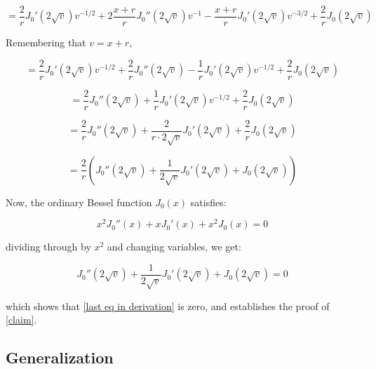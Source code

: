 \documentclass{article}
\begin{document}
\begin{equation*}
=\frac{2}{r} J_0'(2\sqrt{v}) v^{-1/2} + 2\frac{x+r}{r} J_0''(2\sqrt{v}) v^{-1} - \frac{x+r}{r} J_0'(2\sqrt{v}) v^{-3/2}
+ \frac{2}{r} J_0(2\sqrt{v})
\end{equation*}

Remembering that $v=x+r$,


\begin{equation*}
=\frac{2}{r} J_0'(2\sqrt{v}) v^{-1/2} + \frac{2}{r} J_0''(2\sqrt{v}) - \frac{1}{r} J_0'(2\sqrt{v}) v^{-1/2}
+ \frac{2}{r} J_0(2\sqrt{v})
\end{equation*}

\begin{equation*}
=\frac{2}{r} J_0''(2\sqrt{v}) + \frac{1}{r} J_0'(2\sqrt{v}) v^{-1/2} + \frac{2}{r} J_0(2\sqrt{v})
\end{equation*}

\begin{equation*}
=\frac{2}{r} J_0''(2\sqrt{v}) + \frac{2}{r\cdot2\sqrt{v}} J_0'(2\sqrt{v}) + \frac{2}{r} J_0(2\sqrt{v})
\end{equation*}

\begin{equation}
\label{last eq in derivation}
=\frac{2}{r} \left( J_0''(2\sqrt{v}) + \frac{1}{2\sqrt{v}} J_0'(2\sqrt{v}) + J_0(2\sqrt{v})\right)
\end{equation}

Now, the ordinary Bessel function $J_0(x)$ satisfies:

\begin{equation*}
x^2 J_0''(x) + xJ_0'(x) + x^2J_0(x) = 0
\end{equation*}

dividing through by $x^2$ and changing variables, we get:

\begin{equation*}
J_0''(2\sqrt{v}) + \frac{1}{2\sqrt{v}}J_0'(2\sqrt{v}) + J_0(2\sqrt{v}) = 0
\end{equation*}

which shows that \eqref{last eq in derivation} is zero, and establishes the proof of \eqref{claim}.

\subsection*{Generalization}
\parskip 12pt
\end{document}
